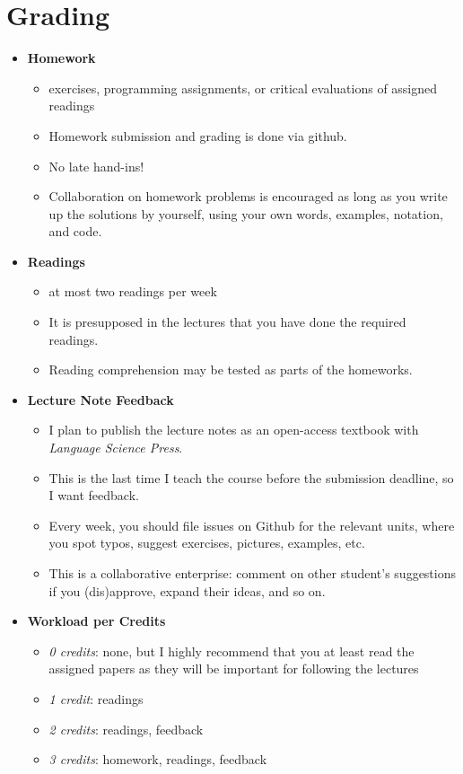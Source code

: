 \section{Grading}
\begin{itemize}
    \item \textbf{Homework}
        \begin{itemize}
            \item exercises, programming assignments, or critical evaluations of assigned readings
            \item Homework submission and grading is done via github.
            \item No late hand-ins!
            \item Collaboration on homework problems is encouraged as long as you write up the solutions by yourself, using your own words, examples, notation, and code.
        \end{itemize}
    \item \textbf{Readings}
        \begin{itemize}
            \item at most two readings per week
            \item It is presupposed in the lectures that you have done the required readings.
            \item Reading comprehension may be tested as parts of the homeworks.
        \end{itemize}
    \item \textbf{Lecture Note Feedback}
        \begin{itemize}
            \item I plan to publish the lecture notes as an open-access textbook with \emph{Language Science Press}.
            \item This is the last time I teach the course before the submission deadline, so I want feedback.
            \item Every week, you should file issues on Github for the relevant units, where you spot typos, suggest exercises, pictures, examples, etc.
            \item This is a collaborative enterprise: comment on other student's suggestions if you (dis)approve, expand their ideas, and so on.
        \end{itemize}
    \item \textbf{Workload per Credits}
        \begin{itemize}
            \item \emph{0 credits}: none, but I highly recommend that you at least read the assigned papers as they will be important for following the lectures
            \item \emph{1 credit}: readings
            \item \emph{2 credits}: readings, feedback
            \item \emph{3 credits}: homework, readings, feedback
        \end{itemize}
\end{itemize}



